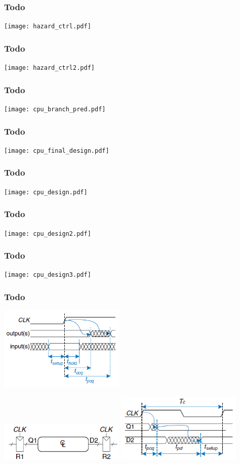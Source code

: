 \documentclass{beamer}
\begin{document}
\begin{frame}
\frametitle{Todo}
\texttt{[image: hazard\_ctrl.pdf]}
\end{frame}

\begin{frame}
\frametitle{Todo}
\texttt{[image: hazard\_ctrl2.pdf]}
\end{frame}

\begin{frame}
\frametitle{Todo}
\texttt{[image: cpu\_branch\_pred.pdf]}
\end{frame}

\begin{frame}
\frametitle{Todo}
\texttt{[image: cpu\_final\_design.pdf]}
\end{frame}

\begin{frame}
\frametitle{Todo}
\texttt{[image: cpu\_design.pdf]}
\end{frame}

\begin{frame}
\frametitle{Todo}
\texttt{[image: cpu\_design2.pdf]}
\end{frame}

\begin{frame}
\frametitle{Todo}
\texttt{[image: cpu\_design3.pdf]}
\end{frame}

\begin{frame}
\frametitle{Todo}
\includegraphics[width=0.45\textwidth]{fig/timing_clk.png}

\includegraphics[width=0.45\textwidth]{fig/timing_clk3.png}
\hfill 
\includegraphics[width=0.45\textwidth]{fig/timing_clk2.png}

\end{frame}
\end{document}
